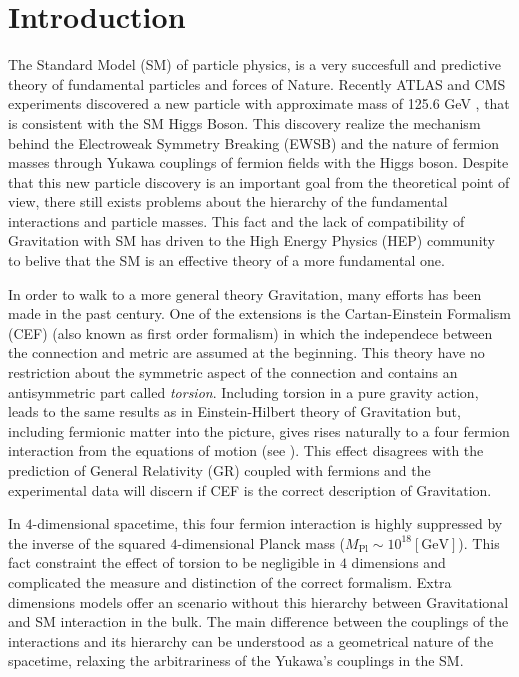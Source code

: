 \section{Introduction}

The Standard Model (SM) of particle physics, is a very succesfull and predictive theory of fundamental particles and forces of Nature. Recently ATLAS and CMS experiments discovered a new particle with approximate mass of 125.6 GeV \cite{Aad:2012tfa,Chatrchyan:2012ufa}, that is consistent with the SM Higgs Boson. This discovery realize the mechanism behind the Electroweak Symmetry Breaking (EWSB) and the nature of fermion masses through Yukawa couplings of fermion fields with the Higgs boson. Despite that this new particle discovery is an important goal from the theoretical point of view, there still exists problems about the hierarchy of the fundamental interactions and particle masses. This fact and the lack of compatibility of Gravitation with SM has driven to the High Energy Physics (HEP) community to belive that the SM is an effective theory of a more fundamental one.

In order to walk to a more general theory Gravitation, many efforts has been made in the past century. One of the extensions is the Cartan-Einstein Formalism (CEF) (also known as first order formalism) in which the independece between the connection and metric are assumed at the beginning. This theory have no restriction about the symmetric aspect of the connection and contains an antisymmetric part called {\it{torsion}}. Including torsion in a pure gravity action, leads to the same results as in Einstein-Hilbert theory of Gravitation but, including fermionic matter into the picture, gives rises naturally to a four fermion interaction from the equations of motion (see \cite{Hehl:1976kj}). This effect disagrees with the prediction of General Relativity (GR) coupled with fermions and the experimental data will discern if CEF is the correct description of Gravitation.

In $4$-dimensional spacetime, this four fermion interaction is highly suppressed by the inverse of the squared $4$-dimensional Planck mass ($M_{\text{Pl}}\sim10^{18}[\text{GeV}]$). This fact constraint the effect of torsion to be negligible in $4$ dimensions and complicated the measure and distinction of the correct formalism. Extra dimensions models \cite{Randall:1999ee,ArkaniHamed:1998rs} offer an scenario without this hierarchy between Gravitational and SM interaction in the bulk. The main difference between the couplings of the interactions and its hierarchy can be understood as a geometrical nature of the spacetime, relaxing the arbitrariness of the Yukawa's couplings in the SM.

